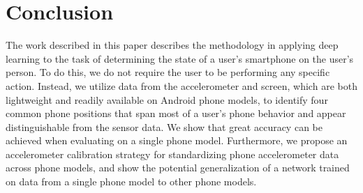 \section{Conclusion}
The work described in this paper describes the methodology in applying deep learning to the task of determining the state of a user's smartphone on the user's person. 
To do this, we do not require the user to be performing any specific action.
Instead, we utilize data from the accelerometer and screen, which are both lightweight and readily available on Android phone models, to identify four common phone positions that span most of a user's phone behavior
and appear distinguishable from the sensor data. 
We show that great accuracy can be achieved when evaluating on a single phone model.
Furthermore, we propose an accelerometer calibration strategy for standardizing phone accelerometer
data across phone models, and show the potential generalization of a network trained on data from a single phone model to other phone models.